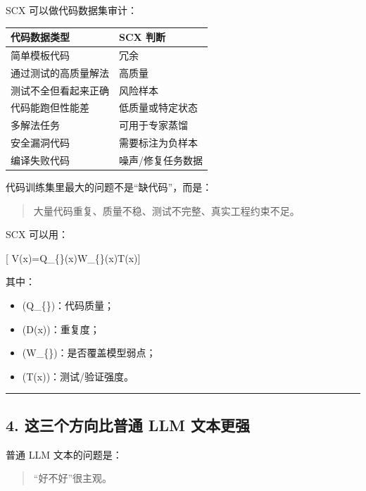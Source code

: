 \documentclass[
  12pt,
]{ctexart}
\providecommand{\tightlist}{%
  \setlength{\itemsep}{0pt}\setlength{\parskip}{0pt}}
\begin{document}
SCX 可以做代码数据集审计：

\begin{longtable}[]{@{}ll@{}}
\toprule\noalign{}
代码数据类型 & SCX 判断 \\
\midrule\noalign{}
\endhead
\bottomrule\noalign{}
\endlastfoot
简单模板代码 & 冗余 \\
通过测试的高质量解法 & 高质量 \\
测试不全但看起来正确 & 风险样本 \\
代码能跑但性能差 & 低质量或特定状态 \\
多解法任务 & 可用于专家蒸馏 \\
安全漏洞代码 & 需要标注为负样本 \\
编译失败代码 & 噪声/修复任务数据 \\
\end{longtable}

代码训练集里最大的问题不是``缺代码''，而是：

\begin{quote}
大量代码重复、质量不稳、测试不完整、真实工程约束不足。
\end{quote}

SCX 可以用：

{[}
V(x)=Q\_\{\}(x)\cdot [1-D(x)]\cdot W\_\{\}(x)\cdot T(x){]}

其中：

\begin{itemize}
\tightlist
\item
  (Q\_\{\})：代码质量；
\item
  (D(x))：重复度；
\item
  (W\_\{\})：是否覆盖模型弱点；
\item
  (T(x))：测试/验证强度。
\end{itemize}

\begin{center}\rule{0.5\linewidth}{0.5pt}\end{center}

\subsection{4. 这三个方向比普通 LLM
文本更强}\label{ux8fd9ux4e09ux4e2aux65b9ux5411ux6bd4ux666eux901a-llm-ux6587ux672cux66f4ux5f3a}

普通 LLM 文本的问题是：

\begin{quote}
``好不好''很主观。
\end{quote}
\end{document}
